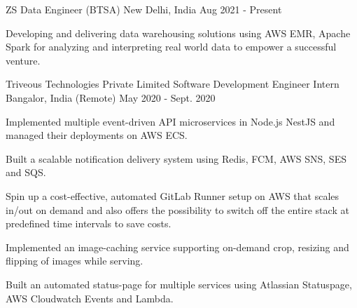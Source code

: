 

\begin{cventries}

  \cventry
    {ZS} %
    {Data Engineer (BTSA)} %
    {New Delhi, India} %
    {Aug 2021 - Present} %
    {
      \begin{cvitems} %
        \item {Developing and delivering data warehousing solutions using AWS EMR, Apache Spark for analyzing and interpreting real world data to empower a successful venture.}
      \end{cvitems}
    }

  \cventry
    {Triveous Technologies Private Limited} %
    {Software Development Engineer Intern} %
    {Bangalor, India (Remote)} %
    {May 2020 - Sept. 2020} %
    {
      \begin{cvitems} %
        \item {Implemented multiple event-driven API microservices in Node.js NestJS and managed their deployments on AWS ECS.}
        \item {Built a scalable notification delivery system using Redis, FCM, AWS SNS, SES and SQS.}
        \item {Spin up a cost-effective, automated GitLab Runner setup on AWS that scales in/out on demand and also offers the possibility to switch off the entire stack at predefined time intervals to save costs.}
        \item {Implemented an image-caching service supporting on-demand crop, resizing and flipping of images while serving.}
        \item {Built an automated status-page for multiple services using Atlassian Statuspage, AWS Cloudwatch Events and Lambda.}
      \end{cvitems}
    }


\end{cventries}
